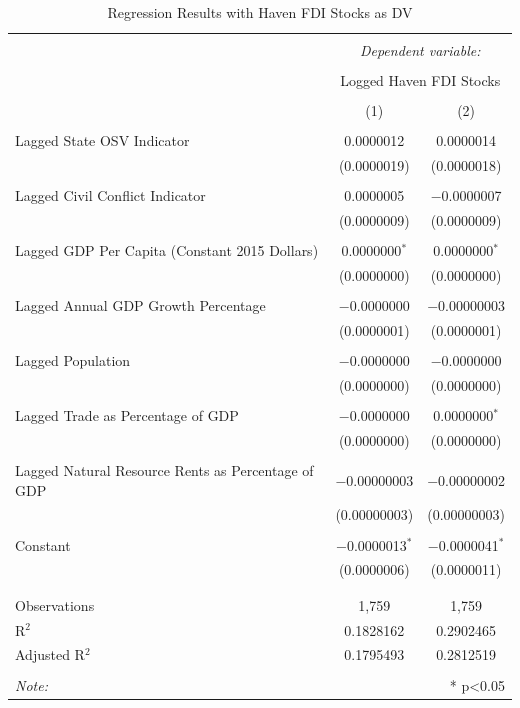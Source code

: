 \documentclass[11pt, titlepage]{article} %
\begin{document}
\begin{table}[!htbp] \centering 
  \caption{Regression Results with Haven FDI Stocks as DV} 
  \label{appreg2} 
\small 
\begin{tabular}{@{\extracolsep{5pt}}lcc} 
\\[-1.8ex]\hline 
\hline \\[-1.8ex] 
 & \multicolumn{2}{c}{\textit{Dependent variable:}} \\ 
\cline{2-3} 
\\[-1.8ex] & \multicolumn{2}{c}{Logged Haven FDI Stocks} \\ 
\\[-1.8ex] & (1) & (2)\\ 
\hline \\[-1.8ex] 
 Lagged State OSV Indicator & 0.0000012 & 0.0000014 \\ 
  & (0.0000019) & (0.0000018) \\ 
  & & \\ 
 Lagged Civil Conflict Indicator & 0.0000005 & $-$0.0000007 \\ 
  & (0.0000009) & (0.0000009) \\ 
  & & \\ 
 Lagged GDP Per Capita (Constant 2015 Dollars) & 0.0000000$^{*}$ & 0.0000000$^{*}$ \\ 
  & (0.0000000) & (0.0000000) \\ 
  & & \\ 
 Lagged Annual GDP Growth Percentage & $-$0.0000000 & $-$0.00000003 \\ 
  & (0.0000001) & (0.0000001) \\ 
  & & \\ 
 Lagged Population & $-$0.0000000 & $-$0.0000000 \\ 
  & (0.0000000) & (0.0000000) \\ 
  & & \\ 
 Lagged Trade as Percentage of GDP & $-$0.0000000 & 0.0000000$^{*}$ \\ 
  & (0.0000000) & (0.0000000) \\ 
  & & \\ 
 Lagged Natural Resource Rents as Percentage of GDP & $-$0.00000003 & $-$0.00000002 \\ 
  & (0.00000003) & (0.00000003) \\ 
  & & \\ 
 Constant & $-$0.0000013$^{*}$ & $-$0.0000041$^{*}$ \\ 
  & (0.0000006) & (0.0000011) \\ 
  & & \\ 
\hline \\[-1.8ex] 
Observations & 1,759 & 1,759 \\ 
R$^{2}$ & 0.1828162 & 0.2902465 \\ 
Adjusted R$^{2}$ & 0.1795493 & 0.2812519 \\ 
\hline 
\hline \\[-1.8ex] 
\textit{Note:}  & \multicolumn{2}{r}{* p<0.05} \\ 
\end{tabular} 
\end{table}
\end{document}

